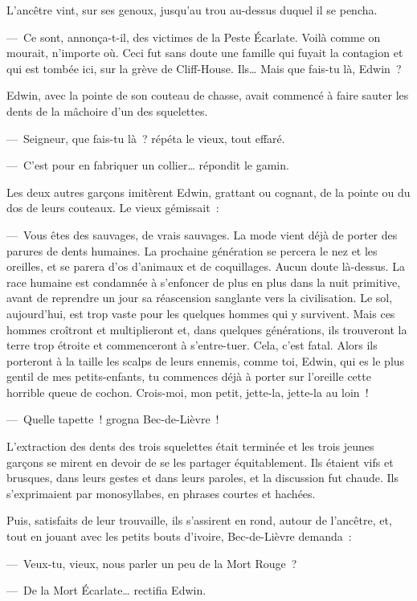 \documentclass[french,twoside]{book} %
\newcommand\chapterclose{} %
\begin{document}
L’ancêtre vint, sur ses genoux, jusqu’au trou au-dessus duquel il se pencha.\par
— Ce sont, annonça-t-il, des victimes de la Peste Écarlate. Voilà comme on mourait, n’importe où. Ceci fut sans doute une famille qui fuyait la contagion et qui est tombée ici, sur la grève de Cliff-House. Ils… Mais que fais-tu là, Edwin ?\par
Edwin, avec la pointe de son couteau de chasse, avait commencé à faire sauter les dents de la mâchoire d’un des squelettes.\par
— Seigneur, que fais-tu là ? répéta le vieux, tout effaré.\par
— C’est pour en fabriquer un collier… répondit le gamin.\par
Les deux autres garçons imitèrent Edwin, grattant ou cognant, de la pointe ou du dos de leurs couteaux. Le vieux gémissait :\par
— Vous êtes des sauvages, de vrais sauvages. La mode vient déjà de porter des parures de dents humaines. La prochaine génération se percera le nez et les oreilles, et se parera d’os d’animaux et de coquillages. Aucun doute là-dessus. La race humaine est condamnée à s’enfoncer de plus en plus dans la nuit primitive, avant de reprendre un jour sa réascension sanglante vers la civilisation. Le sol, aujourd’hui, est trop vaste pour les quelques hommes qui y survivent. Mais ces hommes croîtront et multiplieront et, dans quelques générations, ils trouveront la terre trop étroite et commenceront à s’entre-tuer. Cela, c’est fatal. Alors ils porteront à la taille les scalps de leurs ennemis, comme toi, Edwin, qui es le plus gentil de mes petits-enfants, tu commences déjà à porter sur l’oreille cette horrible queue de cochon. Crois-moi, mon petit, jette-la, jette-la au loin !\par
— Quelle tapette ! grogna Bec-de-Lièvre !\par
L’extraction des dents des trois squelettes était terminée et les trois jeunes garçons se mirent en devoir de se les partager équitablement. Ils étaient vifs et brusques, dans leurs gestes et dans leurs paroles, et la discussion fut chaude. Ils s’exprimaient par monosyllabes, en phrases courtes et hachées.\par
Puis, satisfaits de leur trouvaille, ils s’assirent en rond, autour de l’ancêtre, et, tout en jouant avec les petits bouts d’ivoire, Bec-de-Lièvre demanda :\par
— Veux-tu, vieux, nous parler un peu de la Mort Rouge ?\par
— De la Mort Écarlate… rectifia Edwin.
\chapterclose
\end{document}

